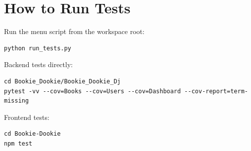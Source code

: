 \documentclass[11pt]{article}
\begin{document}
\section{How to Run Tests}
Run the menu script from the workspace root:
\begin{verbatim}
python run_tests.py
\end{verbatim}
Backend tests directly:
\begin{verbatim}
cd Bookie_Dookie/Bookie_Dookie_Dj
pytest -vv --cov=Books --cov=Users --cov=Dashboard --cov-report=term-missing
\end{verbatim}
Frontend tests:
\begin{verbatim}
cd Bookie-Dookie
npm test
\end{verbatim}
\end{document}
